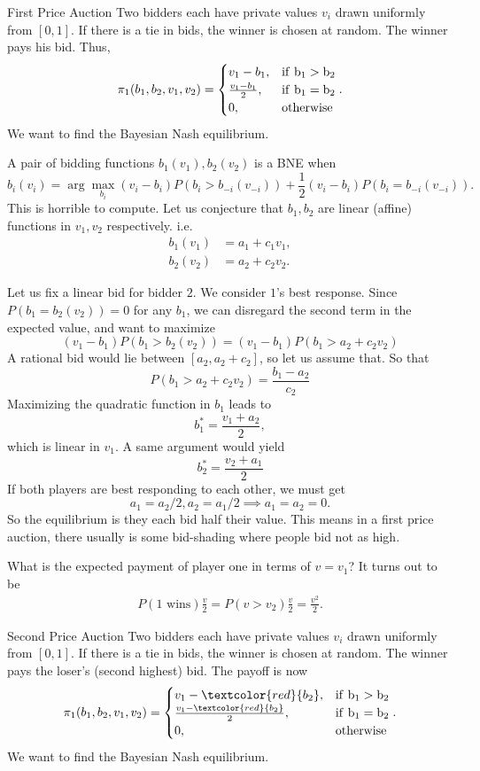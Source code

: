 \begin{aexample}{First Price Auction}{}
    Two bidders each have private values $v_i$ drawn uniformly from $[0,1]$. If there is a tie in bids, the winner is chosen at random. The winner pays his bid. Thus, \[
    \pi_1(b_1,b_2,v_1,v_2) = \begin{cases}
        v_1-b_1, & \rm{if}\ b_1>b_2\\
        \frac{v_1-b_1}{2}, & \rm{if}\ b_1=b_2\\
        0, & \rm{otherwise}
    \end{cases}.
    \]
    We want to find the Bayesian Nash equilibrium.
\end{aexample}
A pair of bidding functions $b_1(v_1),b_2(v_2)$ is a BNE when \[
    b_i(v_i)=\arg\max_{b_i} (v_i-b_i) P(b_i>b_{-i}(v_{-i})) + \frac{1}{2}(v_i-b_i)P(b_i=b_{-i}(v_{-i})).
\]
This is horrible to compute. Let us conjecture that $b_1,b_2$ are linear (affine) functions in $v_1,v_2$ respectively.
i.e. 
\begin{align*}
    b_1(v_1) &= a_1 + c_1v_1,\\
    b_2(v_2) &= a_2 + c_2v_2.
\end{align*} 

Let us fix a linear bid for bidder $2$. We consider $1$'s best response. Since $P(b_1=b_2(v_2))=0$ for any $b_1$, we can disregard the second term in the expected value, and want to maximize \[
    (v_1-b_1) P(b_1>b_{2}(v_{2})) =  (v_1-b_1) P (b_1 > a_2+c_2v_2)
\]
A rational bid would lie between $[a_2,a_2+c_2]$, so let us assume that. So that \[
    P (b_1 > a_2+c_2v_2) = \frac{b_1-a_2}{c_2}
\]
Maximizing the quadratic function in $b_1$ leads to \[
b_1^* = \frac{v_1+a_2}{2},\]
which is linear in $v_1$. A same argument would yield \[
b_2^* = \frac{v_2+a_1}{2}
\]
If both players are best responding to each other, we must get \[
a_1=a_2/2, a_2=a_1/2 \implies a_1=a_2=0.
\]
So the equilibrium is they each bid half their value. This means in a first price auction, there usually is some bid-shading where people bid not as high.

What is the expected payment of player one in terms of $v=v_1$?
It turns out to be \begin{align*}
    P(\textrm{1 wins}) \frac{v}{2} = P(v>v_2) \frac{v}{2} =\frac{v^2}{2}. 
\end{align*}
\begin{aexample}{Second Price Auction}{}
    Two bidders each have private values $v_i$ drawn uniformly from $[0,1]$. If there is a tie in bids, the winner is chosen at random. The winner pays the loser's (second highest) bid. The payoff is now \[
        \pi_1(b_1,b_2,v_1,v_2) = \begin{cases}
            v_1-\textcolor{red}{b_2}, & \rm{if}\  b_1>b_2\\
            \frac{v_1-\textcolor{red}{b_2}}{2}, & \rm{if}\ b_1=b_2\\
            0, & \rm{otherwise}
        \end{cases}.
    \]
    We want to find the Bayesian Nash equilibrium.
\end{aexample}

